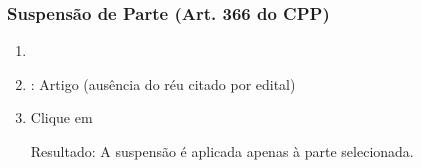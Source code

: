 \documentclass[letterpaper,10pt,brazil]{sphinxmanual}
\begin{document}
\subsubsection{Suspensão de Parte (Art. 366 do CPP)}
\label{\detokenize{projud_55_cadastrosuspensao:suspensao-de-parte-art-366-do-cpp}}\begin{enumerate}
%
\item {} 
\sphinxAtStartPar
{}

\item {} 
\sphinxAtStartPar
{}:
\sphinxhyphen{} Artigo  (ausência do réu citado por edital)

\item {} 
\sphinxAtStartPar
Clique em 

\sphinxAtStartPar
Resultado: A suspensão é aplicada apenas à parte selecionada.

\end{enumerate}
\end{document}
